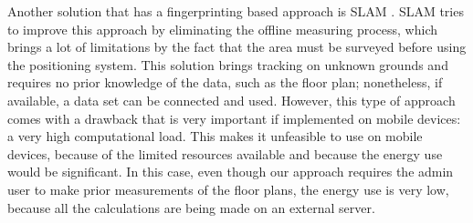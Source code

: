 Another solution that has a fingerprinting based approach is SLAM \cite{SLAM}. SLAM tries to improve this approach by eliminating the offline measuring process, which brings a lot of limitations by the fact that the area must be surveyed before using the positioning system. This solution brings tracking on unknown grounds and requires no prior knowledge of the data, such as the floor plan; nonetheless, if available, a data set can be connected and used. However, this type of approach comes with a drawback that is very important if implemented on mobile devices: a very high computational load. This makes it unfeasible to use on mobile devices, because of the limited resources available and because the energy use would be significant. In this case, even though our approach requires the admin user to make prior measurements of the floor plans, the energy use is very low, because all the calculations are being made on an external server.
